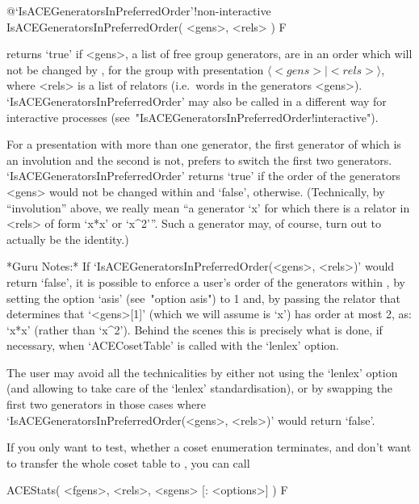 %
{@\noexpand`IsACEGeneratorsInPreferredOrder'!non-interactive}
\>IsACEGeneratorsInPreferredOrder( <gens>, <rels> ) F

returns `true' if <gens>, a list of free group generators, are  in  an
order which will  not  be  changed  by  {\ACE},  for  the  group  with
presentation $\langle <gens> \mid <rels>\rangle$, where  <rels>  is  a
list   of   relators   (i.e.~words   in   the   generators    <gens>).
`IsACEGeneratorsInPreferredOrder' may also be called  in  a  different
way         for         interactive          {\ACE}          processes
(see~"IsACEGeneratorsInPreferredOrder!interactive").

For a presentation with more than one generator, the  first  generator
of which is an involution and the second is  not,  {\ACE}  prefers  to
switch the  first  two  generators.  `IsACEGeneratorsInPreferredOrder'
returns `true' if the order of the  generators  <gens>  would  not  be
changed  within  {\ACE}  and  `false',  otherwise.  (Technically,   by
``involution'' above, we really mean ``a generator `x' for which there
is a relator in <rels> of form `x*x' or `x^2'''. Such a generator may,
of course, turn out to actually be the identity.)

*Guru Notes:*
If  `IsACEGeneratorsInPreferredOrder(<gens>,  <rels>)'  would   return
`false', it is possible to enforce a user's order  of  the  generators
within {\ACE}, by setting the option `asis' (see~"option asis")  to  1
and, by passing the relator that determines that `<gens>[1]' (which we
will assume is `x') has order  at  most  2,  as:  `x*x'  (rather  than
`x^2').  Behind  the  scenes  this  is  precisely  what  is  done,  if
necessary, when `ACECosetTable' is called with the `lenlex' option.

The user may avoid all the technicalities  by  either  not  using  the
`lenlex' option (and allowing {\GAP} to  take  care  of  the  `lenlex'
standardisation), or by swapping the first  two  generators  in  those
cases where  `IsACEGeneratorsInPreferredOrder(<gens>,  <rels>)'  would
return `false'.


If you only want to  test, whether a coset enumeration terminates, and
don't want to  transfer the whole coset table  to {\GAP}, you can call

\>ACEStats( <fgens>, <rels>, <sgens> [: <options>] ) F

